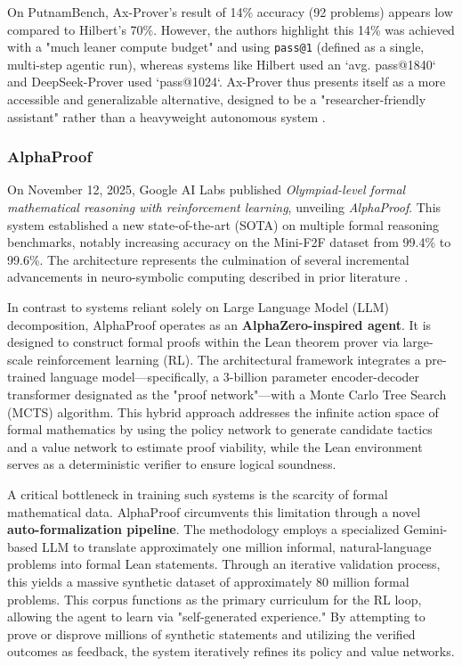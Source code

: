 \documentclass[12pt, letterpaper]{article}
\begin{document}
On PutnamBench, Ax-Prover's result of 14\% accuracy (92 problems) appears low compared to Hilbert's 70\%. However, the authors highlight this 14\% was achieved with a "much leaner compute budget" and using \texttt{pass@1} (defined as a single, multi-step agentic run), whereas systems like Hilbert used an `avg. pass@1840` and DeepSeek-Prover used `pass@1024`. Ax-Prover thus presents itself as a more accessible and generalizable alternative, designed to be a "researcher-friendly assistant" rather than a heavyweight autonomous system \citep{breen2025axproverdeepreasoningagentic}.

\subsubsection{AlphaProof}

On November 12, 2025, Google AI Labs published \textit{Olympiad-level formal mathematical reasoning with reinforcement learning}, unveiling \textit{AlphaProof}. This system established a new state-of-the-art (SOTA) on multiple formal reasoning benchmarks, notably increasing accuracy on the Mini-F2F dataset from 99.4\% to 99.6\%. The architecture represents the culmination of several incremental advancements in neuro-symbolic computing described in prior literature \citep{Hubert2025Nature}.

In contrast to systems reliant solely on Large Language Model (LLM) decomposition, AlphaProof operates as an \textbf{AlphaZero-inspired agent}. It is designed to construct formal proofs within the Lean theorem prover via large-scale reinforcement learning (RL). The architectural framework integrates a pre-trained language model—specifically, a 3-billion parameter encoder-decoder transformer designated as the "proof network"—with a Monte Carlo Tree Search (MCTS) algorithm. This hybrid approach addresses the infinite action space of formal mathematics by using the policy network to generate candidate tactics and a value network to estimate proof viability, while the Lean environment serves as a deterministic verifier to ensure logical soundness.

A critical bottleneck in training such systems is the scarcity of formal mathematical data. AlphaProof circumvents this limitation through a novel \textbf{auto-formalization pipeline}. The methodology employs a specialized Gemini-based LLM to translate approximately one million informal, natural-language problems into formal Lean statements. Through an iterative validation process, this yields a massive synthetic dataset of approximately 80 million formal problems. This corpus functions as the primary curriculum for the RL loop, allowing the agent to learn via "self-generated experience." By attempting to prove or disprove millions of synthetic statements and utilizing the verified outcomes as feedback, the system iteratively refines its policy and value networks.
\end{document}
